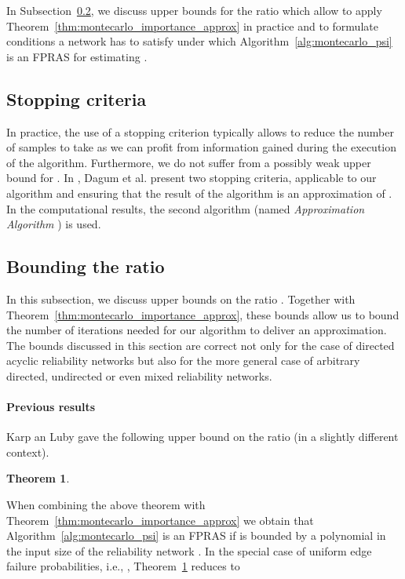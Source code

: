 \documentclass{article}
\newtheorem{theorem}{Theorem}
\begin{document}
In Subsection~\ref{subsec:ratio_bounds}, we discuss upper bounds
for the ratio  which allow to apply
Theorem~\ref{thm:montecarlo_importance_approx} in practice and
to formulate conditions a network has to satisfy under which
Algorithm~\ref{alg:montecarlo_psi} is an FPRAS for
estimating .

\subsection{Stopping criteria}

In practice, the use of a stopping
criterion typically allows to reduce the number of samples to
take as
we can profit from information gained during the execution
of the algorithm. Furthermore, we do not suffer from a possibly
weak upper bound for .
In \cite{dagum_2000_optimal}, Dagum et al. present two stopping criteria,
applicable to our algorithm and ensuring that
the result of the algorithm is an  approximation
of . In the computational results, the second
algorithm (named \textit{Approximation Algorithm }) is
used.

\subsection{Bounding the ratio \texorpdfstring{{}}{}}\label{subsec:ratio_bounds}

In this subsection, we discuss upper bounds on the ratio
. Together with Theorem~\ref{thm:montecarlo_importance_approx},
these bounds allow us to bound the
number of iterations needed for our algorithm to deliver an
 approximation.
The bounds discussed in this
section are correct not only for the case of directed acyclic
reliability networks but also for the more general case
of arbitrary directed, undirected or
even mixed reliability networks.

\paragraph{Previous results}

Karp an Luby \cite{karp_1985_montecarlo} gave the following upper bound on
the ratio  (in a slightly different context).

\begin{theorem}\label{thm:karp_bound_multiplicities}

\end{theorem}

When combining the above theorem with
Theorem~\ref{thm:montecarlo_importance_approx} we obtain that
Algorithm~\ref{alg:montecarlo_psi} is an FPRAS if
 is bounded by a polynomial in the input size
of the reliability network .
In the special case of uniform edge failure probabilities,
i.e., ,
Theorem~\ref{thm:karp_bound_multiplicities} reduces to
\end{document}
